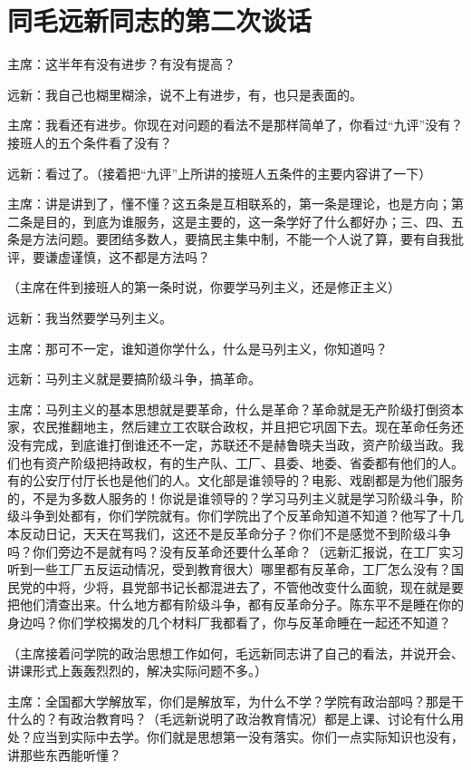 \section[同毛远新同志的第二次谈话（一九六四年八月）]{同毛远新同志的第二次谈话}


主席：这半年有没有进步？有没有提高？

远新：我自己也糊里糊涂，说不上有进步，有，也只是表面的。

主席：我看还有进步。你现在对问题的看法不是那样简单了，你看过“九评”没有？接班人的五个条件看了没有？

远新：看过了。（接着把“九评”上所讲的接班人五条件的主要内容讲了一下）

主席：讲是讲到了，懂不懂？这五条是互相联系的，第一条是理论，也是方向；第二条是目的，到底为谁服务，这是主要的，这一条学好了什么都好办；三、四、五条是方法问题。要团结多数人，要搞民主集中制，不能一个人说了算，要有自我批评，要谦虚谨慎，这不都是方法吗？

（主席在件到接班人的第一条时说，你要学马列主义，还是修正主义）

远新：我当然要学马列主义。

主席：那可不一定，谁知道你学什么，什么是马列主义，你知道吗？

远新：马列主义就是要搞阶级斗争，搞革命。

主席：马列主义的基本思想就是要革命，什么是革命？革命就是无产阶级打倒资本家，农民推翻地主，然后建立工农联合政权，并且把它巩固下去。现在革命任务还没有完成，到底谁打倒谁还不一定，苏联还不是赫鲁晓夫当政，资产阶级当政。我们也有资产阶级把持政权，有的生产队、工厂、县委、地委、省委都有他们的人。有的公安厅付厅长也是他们的人。文化部是谁领导的？电影、戏剧都是为他们服务的，不是为多数人服务的！你说是谁领导的？学习马列主义就是学习阶级斗争，阶级斗争到处都有，你们学院就有。你们学院出了个反革命知道不知道？他写了十几本反动日记，天天在骂我们，这还不是反革命分子？你们不是感觉不到阶级斗争吗？你们旁边不是就有吗？没有反革命还要什么革命？（远新汇报说，在工厂实习听到一些工厂五反运动情况，受到教育很大）哪里都有反革命，工厂怎么没有？国民党的中将，少将，县党部书记长都混进去了，不管他改变什么面貌，现在就是要把他们清查出来。什么地方都有阶级斗争，都有反革命分子。陈东平不是睡在你的身边吗？你们学校揭发的几个材料厂我都看了，你与反革命睡在一起还不知道？

（主席接着问学院的政治思想工作如何，毛远新同志讲了自己的看法，并说开会、讲课形式上轰轰烈烈的，解决实际问题不多。）

主席：全国都大学解放军，你们是解放军，为什么不学？学院有政治部吗？那是干什么的？有政治教育吗？（毛远新说明了政治教育情况）都是上课、讨论有什么用处？应当到实际中去学。你们就是思想第一没有落实。你们一点实际知识也没有，讲那些东西能听懂？

